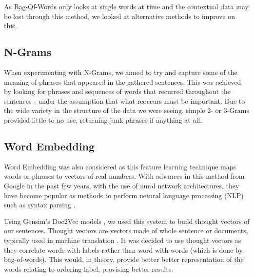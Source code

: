 \documentclass[bsc,frontabs,twoside,singlespacing,parskip,deptreport]{infthesis}     %
\begin{document}
As Bag-Of-Words only looks at single words at time and the contextual data may be lost through this method, we looked at
alternative methods to improve on this.

\subsection{N-Grams}
When experimenting with N-Grams, we aimed to try and capture some of the meaning of phrases that appeared in the gathered
sentences.
This was achieved by looking for phrases and sequences of words that recurred throughout the sentences - under the assumption
that what reoccurs must be important. Due to the wide variety in the structure of the data we were seeing,
simple 2- or 3-Grams provided little to no use, returning junk phrases if anything at all.





\subsection{Word Embedding} \label{sec:word-embedding}
Word Embedding was also considered as this feature learning technique maps words or phrases to vectors of real numbers.
With advances in this method from Google in the past few years, with the use of nural network architectures, they have become
popular as methods to perform netural language processing (NLP) such as syntax parsing \cite{socher2013parsing}.

Using Gensim's Doc2Vec models \cite{rehurek_lrec}, we used this system to build thought vectors of our sentences.
Thought vectors are vectors made of whole sentence or documents, typically used in machine translation \cite{deeplearning4j}.
It was decided to use thought vectors as they correlate words with labels rather than word with words (which is done by bag-of-words).
This would, in theory, provide better better representation of the words relating to ordering label, provising better results.
\end{document}
